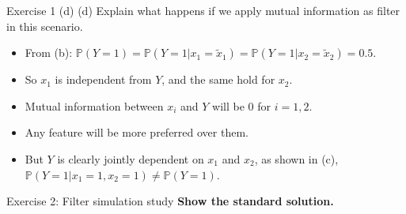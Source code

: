 \documentclass[aspectratio=169]{beamer}
\newcommand{\prob}[1]{\mathbb{P}\left(#1\right)}
\newcommand{\xone}{x_1}
\newcommand{\xtwo}{x_2}
\newcommand{\txone}{\tilde{x}_1}
\newcommand{\txtwo}{\tilde{x}_2}
\begin{document}
\begin{frame}{Exercise 1 (d)}
	(d) Explain what happens if we apply mutual information as filter in this scenario.
	\begin{itemize}
		\item<2-> From (b): $\prob{Y = 1} = \prob{Y = 1 | \xone = \txone} = \prob{Y = 1 | \xtwo = \txtwo} = 0.5$.
		\item<3-> So $\xone$ is independent from $Y$, and the same hold for $\xtwo$.
		\item<4-> Mutual information between $x_i$ and $Y$ will be $0$ for $i = 1, 2$.
		\item<5-> Any feature will be more preferred over them.
		\item<6-> But $Y$ is clearly jointly dependent on $x_1$ and $x_2$, as shown in (c), $\prob{Y=1 | \xone = 1, \xtwo = 1} \neq \prob{Y=1}$.
	\end{itemize}
\end{frame}

\begin{frame}{Exercise 2: Filter simulation study}
	\textbf{Show the standard solution.}
\end{frame}
\end{document}

